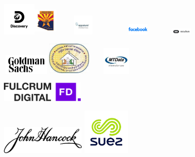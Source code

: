 \documentclass[a4paper]{article}
\begin{document}
\includegraphics[width=0.65486in,height=0.65139in]{media/image9.png}\includegraphics[width=0.47222in,height=0.57639in]{media/image10.jpeg}\includegraphics[width=1.14815in,height=0.39931in]{media/image11.jpg}\includegraphics[width=1.18611in,height=0.22917in]{media/image12.png}\includegraphics[width=0.67361in,height=0.12153in]{media/image13.png}

\includegraphics[width=0.95588in,height=0.39885in]{media/image16.png}\includegraphics[width=0.86736in,height=0.65in]{media/image17.jpg}\includegraphics[width=1.17569in,height=0.54236in]{media/image18.jpg}

\includegraphics[width=1.64288in,height=0.39444in]{media/image19.png}

\includegraphics[width=1.67157in,height=0.56151in]{media/image20.png}\includegraphics[width=1.04412in,height=0.92436in]{media/image21.png}
\end{document}
